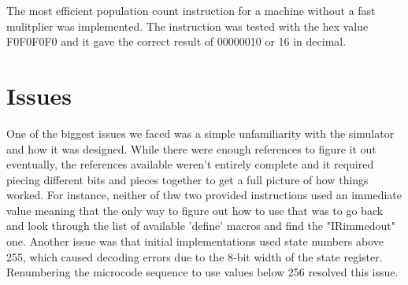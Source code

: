 \documentclass[acmtog]{acmart}
\begin{document}
The most efficient population count instruction for a machine without a fast mulitplier was implemented. The instruction was tested with the hex value F0F0F0F0 and it gave the correct result of 00000010 or 16 in decimal.


\section{Issues}
One of the biggest issues we faced was a simple unfamiliarity with the simulator and how it was designed. While there were enough references to figure it out
eventually, the references available weren't entirely complete and it required piecing different bits and pieces together to get a full picture of how things
worked. For instance, neither of thw two provided instructions used an immediate value meaning that the only way to figure out how to use that was to go back 
and look through the list of available 'define' macros and find the "IRimmedout" one.
Another issue was that initial implementations used state numbers above 255, which caused decoding errors due to the 8‑bit width of the state register. 
Renumbering the microcode sequence to use values below 256 resolved this issue.
\end{document}
